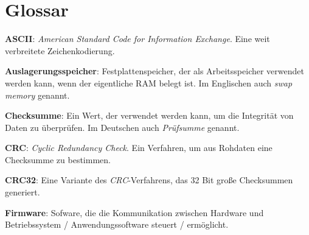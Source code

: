 \section{Glossar}

\textbf{ASCII}:
\textit{American Standard Code for Information Exchange}. Eine weit verbreitete Zeichenkodierung.

\textbf{Auslagerungsspeicher}:
Festplattenspeicher, der als Arbeitsspeicher verwendet werden kann, wenn der eigentliche RAM belegt ist.
Im Englischen auch \textit{swap memory} genannt.

\textbf{Checksumme}:
Ein Wert, der verwendet werden kann, um die Integrität von Daten zu überprüfen.
Im Deutschen auch \textit{Prüfsumme} genannt.

\textbf{CRC}:
\textit{Cyclic Redundancy Check}.
Ein Verfahren, um aus Rohdaten eine Checksumme zu bestimmen.

\textbf{CRC32}:
Eine Variante des \textit{CRC}-Verfahrens, das 32 Bit große Checksummen generiert.

\textbf{Firmware}:
Sofware, die die Kommunikation zwischen Hardware und Betriebssystem / Anwendungssoftware steuert / ermöglicht.
